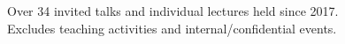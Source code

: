 \newcommand{\talkref}[4]{``#3'' (#2).\\\textit{#4}}
\newcommand{\talkrefwnote}[5]{``#3'' (#2).\\\textit{#4, (#5)}}

\ifdefined\shortcv
    {
        \hspace*{\fill} Over 34 invited talks and individual lectures held since 2017.\\
        \hspace*{\fill} Excludes teaching activities and internal/confidential events.
    }
\else
    {
        
        
    }
\fi


